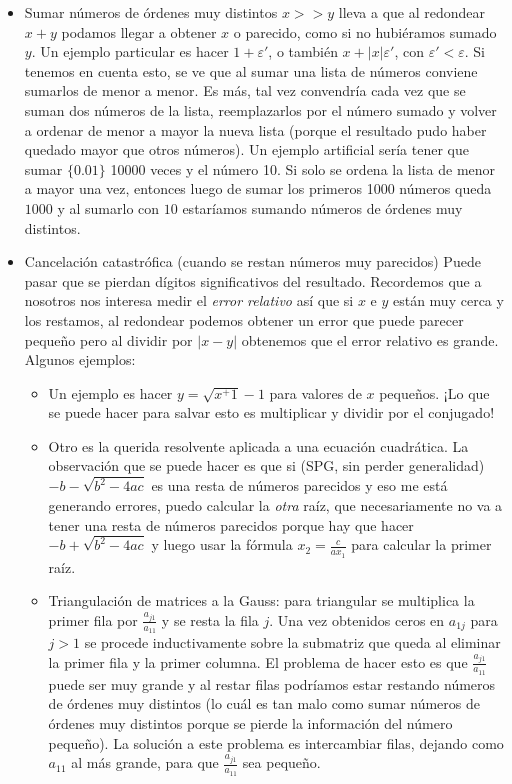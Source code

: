 \documentclass[10pt,a4paper,final]{report}
\begin{document}
{\begin{itemize}
	\item Sumar números de órdenes muy distintos $x >> y$ lleva a que al redondear $x+y$ podamos llegar a obtener $x$ o parecido, como si no hubiéramos sumado $y$. Un ejemplo particular es hacer $1+\varepsilon'$, o también $x + |x| \varepsilon'$, con $\varepsilon' < \varepsilon$. Si tenemos en cuenta esto, se ve que al sumar una lista de números conviene sumarlos de menor a menor. Es más, tal vez convendría cada vez que se suman dos números de la lista, reemplazarlos por el número sumado y volver a ordenar de menor a mayor la nueva lista (porque el resultado pudo haber quedado mayor que otros números). Un ejemplo artificial sería tener que sumar $\{0.01\}$ 10000 veces y el número 10. Si solo se ordena la lista de menor a mayor una vez, entonces luego de sumar los primeros 1000 números queda $1000$ y al sumarlo con $10$ estaríamos sumando números de órdenes muy distintos.
	\item Cancelación catastrófica (cuando se restan números muy parecidos) Puede pasar que se pierdan dígitos significativos del resultado. Recordemos que a nosotros nos interesa medir el \textit{error relativo} así que si $x$ e $y$ están muy cerca y los restamos, al redondear podemos obtener un error que puede parecer pequeño pero al dividir por $|x-y|$ obtenemos que el error relativo es grande. Algunos ejemplos:
	\begin{itemize}
		\item Un ejemplo es hacer $y = \sqrt{x^+1}-1$ para valores de $x$ pequeños. ¡Lo que se puede hacer para salvar esto es multiplicar y dividir por el conjugado!
		\item Otro es la querida resolvente aplicada a una ecuación cuadrática. La observación que se puede hacer es que si (SPG, sin perder generalidad) $-b - \sqrt{b^2-4ac}$ es una resta de números parecidos y eso me está generando errores, puedo calcular la \textit{otra} raíz, que necesariamente no va a tener una resta de números parecidos porque hay que hacer $-b + \sqrt{b^2-4ac}$ y luego usar la fórmula $x_2 = \frac{c}{a x_1}$ para calcular la primer raíz.
		\item Triangulación de matrices a la Gauss: para triangular se multiplica la primer fila por $\frac{a_{j1}}{a_{11}}$ y se resta la fila $j$. Una vez obtenidos ceros en $a_{1j}$ para $j>1$ se procede inductivamente sobre la submatriz que queda al eliminar la primer fila y la primer columna. El problema de hacer esto es que $\frac{a_{j1}}{a_{11}}$ puede ser muy grande y al restar filas podríamos estar restando números de órdenes muy distintos (lo cuál es tan malo como sumar números de órdenes muy distintos porque se pierde la información del número pequeño). La solución a este problema es intercambiar filas, dejando como $a_{11}$ al más grande, para que $\frac{a_{j1}}{a_{11}}$ sea pequeño.

\end{itemize}
\end{itemize}}
\end{document}
